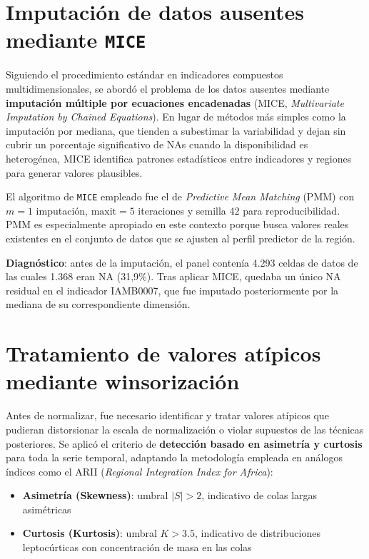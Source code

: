 \section{Imputación de datos ausentes mediante \texttt{MICE}}

Siguiendo el procedimiento estándar en indicadores compuestos multidimensionales, se abordó el problema de los datos ausentes mediante \textbf{imputación múltiple por ecuaciones encadenadas} (MICE, \emph{Multivariate Imputation by Chained Equations}). En lugar de métodos más simples como la imputación por mediana, que tienden a subestimar la variabilidad y dejan sin cubrir un porcentaje significativo de NAs cuando la disponibilidad es heterogénea, MICE identifica patrones estadísticos entre indicadores y regiones para generar valores plausibles.

El algoritmo de \texttt{MICE} empleado fue el de \emph{Predictive Mean Matching} (PMM) con $m=1$ imputación, $\text{maxit}=5$ iteraciones y semilla 42 para reproducibilidad. PMM es especialmente apropiado en este contexto porque busca valores reales existentes en el conjunto de datos que se ajusten al perfil predictor de la región.

\textbf{Diagnóstico}: antes de la imputación, el panel contenía 4.293 celdas de datos de las cuales 1.368 eran NA (31,9\%). Tras aplicar MICE, quedaba un único NA residual en el indicador IAMB0007, que fue imputado posteriormente por la mediana de su correspondiente dimensión.

\section{Tratamiento de valores atípicos mediante winsorización}

Antes de normalizar, fue necesario identificar y tratar valores atípicos que pudieran distorsionar la escala de normalización o violar supuestos de las técnicas posteriores. Se aplicó el criterio de \textbf{detección basado en asimetría y curtosis} para toda la serie temporal, adaptando la metodología empleada en análogos índices como el ARII (\emph{Regional Integration Index for Africa}):

\begin{itemize}
    \item \textbf{Asimetría (Skewness)}: umbral $|S| > 2$, indicativo de colas largas asimétricas
    \item \textbf{Curtosis (Kurtosis)}: umbral $K > 3.5$, indicativo de distribuciones leptocúrticas con concentración de masa en las colas
\end{itemize}

